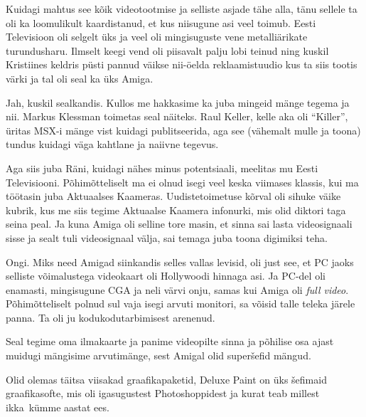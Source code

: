 Kuidagi mahtus see kõik videotootmise ja selliste asjade tähe alla, tänu 
sellele ta oli ka loomulikult kaardistanud, et kus niisugune asi veel toimub. 
Eesti Televisioon oli selgelt 
üks ja veel oli mingisuguste vene metalliärikate turundusharu. Ilmselt keegi 
vend oli piisavalt palju lobi teinud ning kuskil Kristiines  keldris püsti 
pannud väikse nii-öelda reklaamistuudio kus ta siis tootis värki ja tal oli 
seal ka üks Amiga. 


Jah, kuskil sealkandis. Kullos me hakkasime ka juba mingeid mänge tegema ja 
nii. Markus Klessman toimetas seal näiteks. Raul 
Keller, kelle aka oli 
\enquote{Killer}, üritas MSX-i mänge vist 
kuidagi publitseerida, aga see (vähemalt mulle ja toona) tundus kuidagi väga 
kahtlane ja naiivne tegevus.

Aga siis juba Räni, kuidagi nähes minus potentsiaali, 
meelitas mu Eesti Televisiooni. Põhimõtteliselt ma ei olnud isegi veel keska viimases klassis, 
kui ma töötasin juba Aktuaalses Kaameras. Uudistetoimetuse kõrval oli sihuke 
väike kubrik, kus me siis tegime Aktuaalse Kaamera infonurki, mis olid  diktori 
taga seina peal. Ja kuna Amiga oli selline tore masin, et  
sinna sai lasta videosignaali sisse ja sealt tuli videosignaal välja, sai 
temaga juba toona digimiksi teha. 


Ongi. Miks need Amigad siinkandis selles vallas levisid, oli just see, et PC 
jaoks selliste võimalustega videokaart oli Hollywoodi hinnaga asi. Ja PC-del 
oli enamasti, mingisugune CGA ja neli värvi onju, samas kui 
Amiga oli \emph{full video}. Põhimõtteliselt polnud sul 
vaja isegi arvuti monitori, sa võisid talle teleka järele panna. Ta oli ju  
kodukodutarbimisest arenenud. 

Seal tegime oma ilmakaarte ja panime videopilte sinna ja põhilise osa ajast 
muidugi mängisime arvutimänge, sest  Amigal olid superšefid mängud. 


Olid olemas täitsa viisakad graafikapaketid, Deluxe Paint on üks šefimaid graafikasofte, mis oli igasugustest 
Photoshoppidest ja kurat teab millest ikka kümme aastat ees. 

